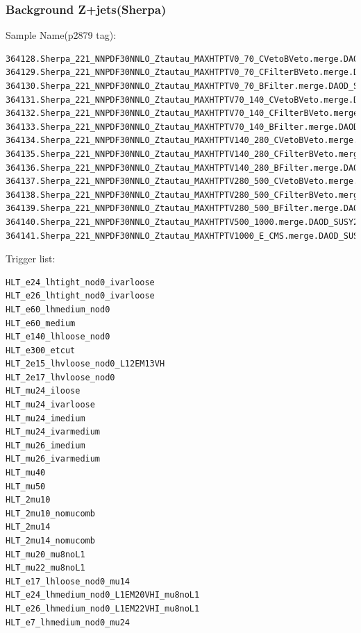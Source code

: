 \documentclass[mathserif,serif]{beamer}
\begin{document}
\begin{frame}[fragile]
\frametitle{Background Z+jets(Sherpa)}
\small
Sample Name(p2879 tag):
\tiny
\begin{verbatim}
364128.Sherpa_221_NNPDF30NNLO_Ztautau_MAXHTPTV0_70_CVetoBVeto.merge.DAOD_SUSY2.e5307_s2726_r7772_r7676_p2879
364129.Sherpa_221_NNPDF30NNLO_Ztautau_MAXHTPTV0_70_CFilterBVeto.merge.DAOD_SUSY2.e5307_s2726_r7772_r7676_p2879
364130.Sherpa_221_NNPDF30NNLO_Ztautau_MAXHTPTV0_70_BFilter.merge.DAOD_SUSY2.e5307_s2726_r7772_r7676_p2879
364131.Sherpa_221_NNPDF30NNLO_Ztautau_MAXHTPTV70_140_CVetoBVeto.merge.DAOD_SUSY2.e5307_s2726_r7772_r7676_p2879
364132.Sherpa_221_NNPDF30NNLO_Ztautau_MAXHTPTV70_140_CFilterBVeto.merge.DAOD_SUSY2.e5307_s2726_r7772_r7676_p2879
364133.Sherpa_221_NNPDF30NNLO_Ztautau_MAXHTPTV70_140_BFilter.merge.DAOD_SUSY2.e5307_s2726_r7772_r7676_p2879
364134.Sherpa_221_NNPDF30NNLO_Ztautau_MAXHTPTV140_280_CVetoBVeto.merge.DAOD_SUSY2.e5307_s2726_r7772_r7676_p2879
364135.Sherpa_221_NNPDF30NNLO_Ztautau_MAXHTPTV140_280_CFilterBVeto.merge.DAOD_SUSY2.e5307_s2726_r7772_r7676_p2879
364136.Sherpa_221_NNPDF30NNLO_Ztautau_MAXHTPTV140_280_BFilter.merge.DAOD_SUSY2.e5307_s2726_r7772_r7676_p2879
364137.Sherpa_221_NNPDF30NNLO_Ztautau_MAXHTPTV280_500_CVetoBVeto.merge.DAOD_SUSY2.e5307_s2726_r7772_r7676_p2879
364138.Sherpa_221_NNPDF30NNLO_Ztautau_MAXHTPTV280_500_CFilterBVeto.merge.DAOD_SUSY2.e5313_s2726_r7772_r7676_p2879
364139.Sherpa_221_NNPDF30NNLO_Ztautau_MAXHTPTV280_500_BFilter.merge.DAOD_SUSY2.e5313_s2726_r7772_r7676_p2879
364140.Sherpa_221_NNPDF30NNLO_Ztautau_MAXHTPTV500_1000.merge.DAOD_SUSY2.e5307_s2726_r7772_r7676_p2879
364141.Sherpa_221_NNPDF30NNLO_Ztautau_MAXHTPTV1000_E_CMS.merge.DAOD_SUSY2.e5307_s2726_r7772_r7676_p2879
\end{verbatim}
\end{frame}

\begin{frame}[fragile]
\small
Trigger list:\\
\scriptsize
\begin{verbatim}
HLT_e24_lhtight_nod0_ivarloose
HLT_e26_lhtight_nod0_ivarloose
HLT_e60_lhmedium_nod0
HLT_e60_medium
HLT_e140_lhloose_nod0
HLT_e300_etcut
HLT_2e15_lhvloose_nod0_L12EM13VH
HLT_2e17_lhvloose_nod0
HLT_mu24_iloose
HLT_mu24_ivarloose
HLT_mu24_imedium
HLT_mu24_ivarmedium
HLT_mu26_imedium
HLT_mu26_ivarmedium
HLT_mu40
HLT_mu50
HLT_2mu10
HLT_2mu10_nomucomb
HLT_2mu14
HLT_2mu14_nomucomb
HLT_mu20_mu8noL1
HLT_mu22_mu8noL1
HLT_e17_lhloose_nod0_mu14
HLT_e24_lhmedium_nod0_L1EM20VHI_mu8noL1
HLT_e26_lhmedium_nod0_L1EM22VHI_mu8noL1
HLT_e7_lhmedium_nod0_mu24
\end{verbatim}
\end{frame}
\end{document}

